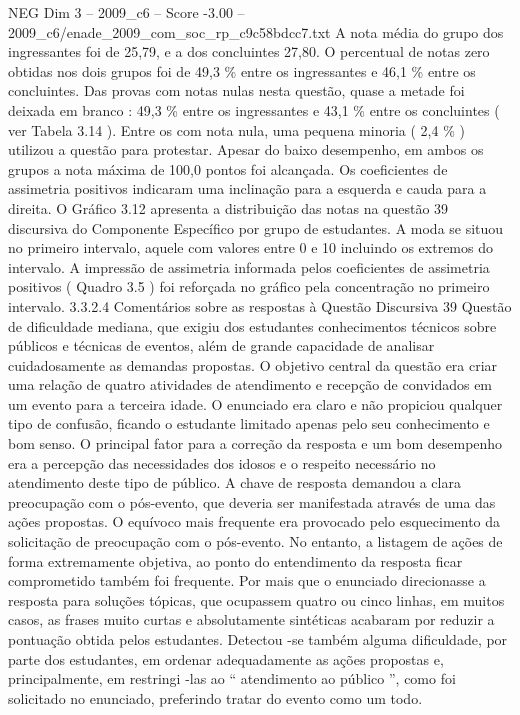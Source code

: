 \begin{textsample}{NEG Dim 3 – 2009\_c6 – Score -3.00 – 2009\_c6/enade\_2009\_com\_soc\_rp\_c9c58bdcc7.txt}
A nota média do grupo dos ingressantes foi de 25,79, e a dos concluintes 27,80.
O percentual de notas zero obtidas nos dois grupos foi de 49,3 \% entre os ingressantes e 46,1 \% entre os concluintes.
Das provas com notas nulas nesta questão, quase a metade foi deixada em branco : 49,3 \% entre os ingressantes e 43,1 \% entre os concluintes ( ver Tabela 3.14 ).
Entre os com nota nula, uma pequena minoria ( 2,4 \% ) utilizou a questão para protestar.
Apesar do baixo desempenho, em ambos os grupos a nota máxima de 100,0 pontos foi alcançada.
Os coeficientes de assimetria positivos indicaram uma inclinação para a esquerda e cauda para a direita.
O Gráfico 3.12 apresenta a distribuição das notas na questão 39 discursiva do Componente Específico por grupo de estudantes.
A moda se situou no primeiro intervalo, aquele com valores entre 0 e 10 incluindo os extremos do intervalo.
A impressão de assimetria informada pelos coeficientes de assimetria positivos ( Quadro 3.5 ) foi reforçada no gráfico pela concentração no primeiro intervalo. 3.3.2.4 Comentários sobre as respostas à Questão Discursiva 39 Questão de dificuldade mediana, que exigiu dos estudantes conhecimentos técnicos sobre públicos e técnicas de eventos, além de grande capacidade de analisar cuidadosamente as demandas propostas.
O objetivo central da questão era criar uma relação de quatro atividades de atendimento e recepção de convidados em um evento para a terceira idade.
O enunciado era claro e não propiciou qualquer tipo de confusão, ficando o estudante limitado apenas pelo seu conhecimento e bom senso.
O principal fator para a correção da resposta e um bom desempenho era a percepção das necessidades dos idosos e o respeito necessário no atendimento deste tipo de público.
A chave de resposta demandou a clara preocupação com o pós-evento, que deveria ser manifestada através de uma das ações propostas.
O equívoco mais frequente era provocado pelo esquecimento da solicitação de preocupação com o pós-evento.
No entanto, a listagem de ações de forma extremamente objetiva, ao ponto do entendimento da resposta ficar comprometido também foi frequente.
Por mais que o enunciado direcionasse a resposta para soluções tópicas, que ocupassem quatro ou cinco linhas, em muitos casos, as frases muito curtas e absolutamente sintéticas acabaram por reduzir a pontuação obtida pelos estudantes.
Detectou -se também alguma dificuldade, por parte dos estudantes, em ordenar adequadamente as ações propostas e, principalmente, em restringi -las ao “ atendimento ao público ”, como foi solicitado no enunciado, preferindo tratar do evento como um todo.

\end{textsample}
